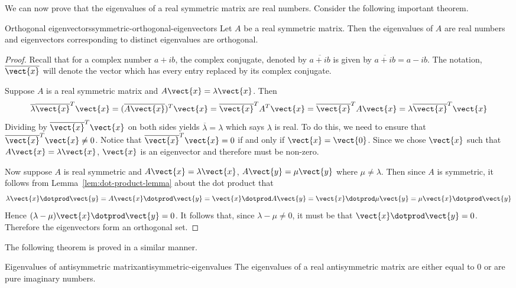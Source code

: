 We can now prove that the eigenvalues of a real symmetric matrix are real numbers.  Consider the following important theorem.

\begin{theorem}{Orthogonal eigenvectors}{symmetric-orthogonal-eigenvectors}
Let $A$ be a real symmetric matrix. Then the eigenvalues of $A$ are real numbers and eigenvectors corresponding to distinct eigenvalues are orthogonal.
\end{theorem}

\begin{proof}
Recall that for a complex number $a+ib$, the complex conjugate, denoted by $
\overline{a+ib}$ is given by $\overline{a+ib}=a-ib$. The
notation, $\overline{\vect{x}}$ will denote the vector which has every
entry replaced by its complex conjugate.

Suppose $A$ is a real symmetric matrix and $A\vect{x}=\lambda \vect{x}$.
Then
\begin{equation*}
\overline{\lambda }\overline{\vect{x}}^{T}\vect{x}=(\overline{A
\vect{x}}) ^{T}\vect{x}=\overline{\vect{x}}^{T}A^{T}\vect{x}=
\overline{\vect{x}}^{T}A\vect{x}=\lambda \overline{\vect{x}}^{T}
\vect{x}
\end{equation*}
Dividing by $\overline{\vect{x}}^{T}\vect{x}$ on both sides yields $
\overline{\lambda }=\lambda $ which says $\lambda $ is real. To do this, we need to ensure that $\overline{\vect{x}}^{T}\vect{x} \neq 0$. Notice that $\overline{\vect{x}}^{T}\vect{x} = 0$ if and only if $\vect{x} = \vect{0}$. Since we chose $\vect{x}$ such that $A\vect{x} = \lambda \vect{x}$, $\vect{x}$ is an eigenvector and therefore must be non-zero.

Now suppose $A$ is real symmetric and $A\vect{x}=\lambda \vect{x}$, $A
\vect{y}=\mu \vect{y}$ where $\mu \neq \lambda$. Then since $A$
is symmetric, it follows from Lemma~\ref{lem:dot-product-lemma} about the dot product that
\begin{equation*}
\lambda \vect{x}\dotprod \vect{y}=A\vect{x}\dotprod \vect{y}=\vect{x}\dotprod A\vect{y}=\vect{x}\dotprod \mu \vect{y}=\mu \vect{x}\dotprod \vect{y}
\end{equation*}
Hence $(\lambda -\mu) \vect{x}\dotprod \vect{y}=0$. It follows that,
since $\lambda -\mu \neq 0$, it must be that $\vect{x}\dotprod \vect{y}=0$. Therefore the eigenvectors form an orthogonal set.
\end{proof}

The following theorem is proved in a similar manner.

\begin{theorem}{Eigenvalues of antisymmetric matrix}{antisymmetric-eigenvalues}
The eigenvalues of a real antisymmetric matrix are either equal to $0$ or are pure imaginary numbers.
\end{theorem}

